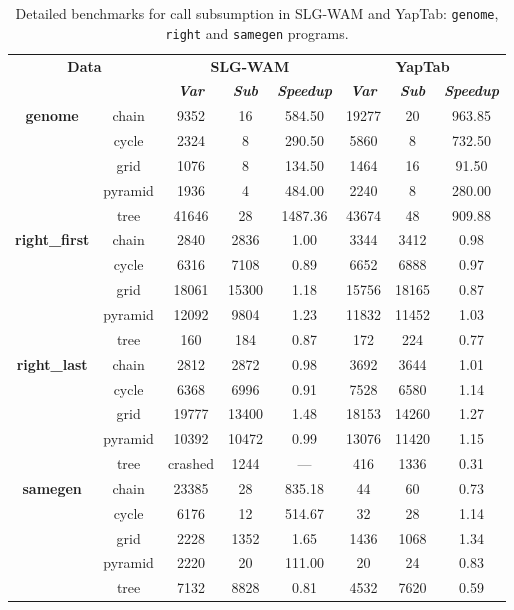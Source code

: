 \begin{table}[ht]
\centering
\footnotesize{
  \begin{tabular}{cc|ccc|ccc}
   \hline
    \hline
    \multicolumn{2}{c|}{\multirow{2}{*}{\small{\textbf{Data}}}} & \multicolumn{3}{c|}{\small{\textbf{SLG-WAM}}} & \multicolumn{3}{c}{\small{\textbf{YapTab}}} \\
     \multicolumn{2}{c|}{} & \textbf{\textit{Var}} & \textbf{\textit{Sub}} & \textbf{\textit{Speedup}} & \textbf{\textit{Var}} & \textbf{\textit{Sub}} & \textbf{\textit{Speedup}} \\
   \hline
   \hline
\multirow{5}{*}{\textbf{genome}} &  \scriptsize{chain}  &  9352 & 16 &  584.50  & 19277 & 20 &  963.85 \\
&  \scriptsize{cycle}  &  2324 & 8 &  290.50  & 5860 & 8 &  732.50 \\
&  \scriptsize{grid}  &  1076 & 8 &  134.50  & 1464 & 16 &  91.50 \\
&  \scriptsize{pyramid}  &  1936 & 4 &  484.00  & 2240 & 8 &  280.00 \\
&  \scriptsize{tree}  &  41646 & 28 &  1487.36  & 43674 & 48 &  909.88 \\
\hline
\multirow{5}{*}{\textbf{right\_first}} &  \scriptsize{chain}  &  2840 & 2836 &  1.00  & 3344 & 3412 &  0.98 \\
&  \scriptsize{cycle}  &  6316 & 7108 &  0.89  & 6652 & 6888 &  0.97 \\
&  \scriptsize{grid}  &  18061 & 15300 &  1.18  & 15756 & 18165 &  0.87 \\
&  \scriptsize{pyramid}  &  12092 & 9804 &  1.23  & 11832 & 11452 &  1.03 \\
&  \scriptsize{tree}  &  160 & 184 &  0.87  & 172 & 224 &  0.77 \\
\hline
\multirow{5}{*}{\textbf{right\_last}} &  \scriptsize{chain}  &  2812 & 2872 &  0.98  & 3692 & 3644 &  1.01 \\
&  \scriptsize{cycle}  &  6368 & 6996 &  0.91  & 7528 & 6580 &  1.14 \\
&  \scriptsize{grid}  &  19777 & 13400 &  1.48  & 18153 & 14260 &  1.27 \\
&  \scriptsize{pyramid}  &  10392 & 10472 &  0.99  & 13076 & 11420 &  1.15 \\
&  \scriptsize{tree}  &  \scriptsize{crashed} & 1244 &  ---  & 416 & 1336 &  0.31 \\
\hline
\multirow{5}{*}{\textbf{samegen}} &  \scriptsize{chain}  &  23385 & 28 &  835.18  & 44 & 60 &  0.73 \\
&  \scriptsize{cycle}  &  6176 & 12 &  514.67  & 32 & 28 &  1.14 \\
&  \scriptsize{grid}  &  2228 & 1352 &  1.65  & 1436 & 1068 &  1.34 \\
&  \scriptsize{pyramid}  &  2220 & 20 &  111.00  & 20 & 24 &  0.83 \\
&  \scriptsize{tree}  &  7132 & 8828 &  0.81  & 4532 & 7620 &  0.59 \\
\hline
\hline
\end{tabular}
}
\caption{Detailed benchmarks for call subsumption in SLG-WAM and YapTab: \texttt{genome}, \texttt{right} and \texttt{samegen} programs.}
\label{tbl:result_path_detail2}
\end{table}
